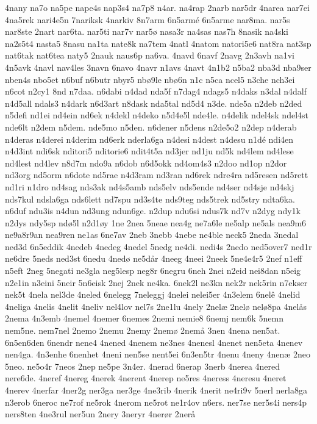 {4nany
na7o
na5pe
nape4s
nap3s4
na7p8
n4ar.
na4rap
2narb
nar5dr
4narea
nar7ei
4na5rek
nari4e5n
7nariksk
4narkiv
8n7arm
6n5armé
6n5arme
nar8ma.
nar5s
nar8ste
2nart
nar6ta.
nar5ti
nar7v
nar5ø
nasa3r
na4sas
nas7h
8nasik
na4ski
na2s5t4
nasta5
8nasu
na1ta
nate8k
na7tem
4natl
4natom
natori5e6
nat8ra
nat3sp
nat6tak
nat6tea
naty5
2nauk
naus6p
na6va.
4navd
6navf
2navg
2n3avh
na1vi
4n5avk
4navl
nav4les
3navn
6navo
4navr
n1avs
4navt
4n1b2
n5ba2
nba3d
nba9ser
nben4s
nbo5et
n6buf
n6butr
nbyr5
nbø9le
nbø6n
n1c
n5ca
ncel5
n3che
nch3ei
n6cot
n2cy1
8nd
n7daa.
n6dabi
n4dad
nda5f
n7dag4
ndags5
n4daks
n3dal
n4dalf
n4d5all
ndals3
n4dark
n6d3art
n8dask
nda5tal
nd5d4
n3de.
nde5a
n2deb
n2ded
n5defi
nd1ei
nd4ein
nd6ek
n4dekl
n4deko
n5d4e5l
nde4le.
n4delik
ndel4sk
ndel4st
nde6lt
n2dem
n5dem.
nde5mo
n5den.
n6dener
n5dens
n2de5o2
n2dep
n4derab
n4deras
n4derei
n4derim
nd6erk
nderla6ga
n4desi
n4dest
n4desu
n1dé
ndi4en
n4d3int
ndi6sk
nditori5
nditorie6
ndit4t5a
nd3jer
nd1ju
nd5k
nd4lem
nd4lese
nd4lest
nd4lev
n8d7m
ndo9a
n6dob
n6d5okk
nd4om4s3
n2doo
nd1op
n2dor
nd3org
nd5orm
n6dote
nd5rae
n4d3ram
nd3ran
nd6rek
ndre4ra
nd5resen
nd5rett
nd1ri
n1dro
nd4sag
nds3ak
nd4s5amb
nds5elv
nds5ende
nd4ser
nd4sje
nd4skj
nds7kul
ndsla6ga
nds6lett
nd7spu
nd3s4te
nds9teg
nds5trek
nd5stry
ndta6ka.
n6duf
ndu3is
n4dun
nd3ung
ndun6ge.
n2dup
ndu6si
ndus7k
nd7v
n2dyg
ndy1k
n2dys
ndy5sp
ndø5l
n2d1øy
1ne
2nea
5neae
nea4g
ne7a6le
ne5alp
ne5als
nea9m6
ne9a8r9an
nea9ren
ne1as
6ne7av
2neb
3nebb
4nebe
ne4ble
neck5
2neda
3nedal
ned3d
6n5eddik
4nedeb
4nedeg
4nedel
5nedg
ne4di.
nedi4s
2nedo
ned5over7
ned1r
ne6dre
5neds
ned3st
6nedu
4nedø
ne5dår
4neeg
4neei
2neek
5ne4e4r5
2nef
n1eff
n5eft
2neg
5negati
ne3gla
neg5lesp
neg8r
6negru
6neh
2nei
n2eid
nei8dan
n5eig
n2e1in
n3eini
5neir
5n6eisk
2nej
2nek
ne4ka.
6nek2l
ne3kn
nek2r
nek5rin
n7ekser
nek5t
4nela
nel3de
4neled
6nelegg
7neleggj
4nelei
nelei5er
4n3elem
6nelê
4nelid
4neliga
4nelis
4nelit
4neliv
nel4lov
nel7s
2ne1lu
4nely
2nelæ
2nelø
nelø8pa
4nelås
2nema
4n3emb
4nemel
4nemer
6nemes
2nemi
nemie8
6nemj
nem6k
5nemn
nem5ne.
nem7nel
2nemo
2nemu
2nemy
2nemø
2nemå
3nen
4nena
nen5at.
6n5en6den
6nendr
nene4
4nened
4nenem
ne3nes
4nenesl
4nenet
nen5eta
4nenev
nen4ga.
4n3enhe
6nenhet
4neni
nen5se
nent5ei
6n3en5tr
4nenu
4neny
4nenæ
2neo
5neo.
ne5o4r
7neos
2nep
ne5pe
3n4er.
4nerad
6nerap
3nerb
4nerea
4nered
nere6de.
4neref
4nereg
4nerek
4nerent
4nerep
ne5res
4neress
4neresu
4neret
4nerev
4nerfar
4ner2g
ner3ga
ner3ge
4ne3rib
4nerik
4nerit
ne4ri9v
5nerl
nerla8ga
n3erob
6neroc
ne7rof
ne5rok
4nerom
ne5rot
ne1r4ov
n6ers.
ner7se
ner5s4i
ners4p
ners8ten
4ne3rul
ner5un
2nery
3neryr
4nerør
2nerå
}
